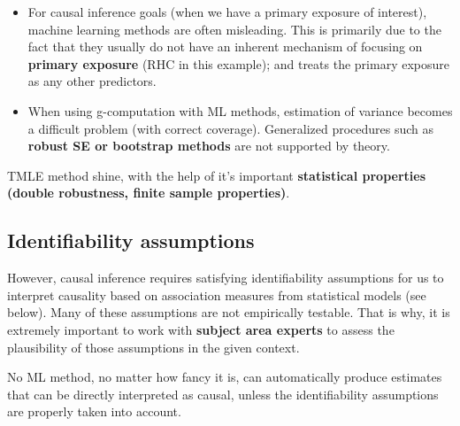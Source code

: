 \documentclass[
]{book}
\providecommand{\tightlist}{%
  \setlength{\itemsep}{0pt}\setlength{\parskip}{0pt}}
\begin{document}
\begin{itemize}
\tightlist
\item
  For causal inference goals (when we have a primary exposure of interest), machine learning methods are often misleading. This is primarily due to the fact that they usually do not have an inherent mechanism of focusing on \textbf{primary exposure} (RHC in this example); and treats the primary exposure as any other predictors.
\item
  When using g-computation with ML methods, estimation of variance becomes a difficult problem (with correct coverage). Generalized procedures such as \textbf{robust SE or bootstrap methods} are not supported by theory.
\end{itemize}

\begin{rmdcomment}
TMLE method shine, with the help of it's important \textbf{statistical
properties (double robustness, finite sample properties)}.
\end{rmdcomment}

\hypertarget{identifiability-assumptions}{%
\subsection{Identifiability assumptions}\label{identifiability-assumptions}}

However, causal inference requires satisfying identifiability assumptions for us to interpret causality based on association measures from statistical models (see below). Many of these assumptions are not empirically testable. That is why, it is extremely important to work with \textbf{subject area experts} to assess the plausibility of those assumptions in the given context.

\begin{rmdcomment}
No ML method, no matter how fancy it is, can automatically produce
estimates that can be directly interpreted as causal, unless the
identifiability assumptions are properly taken into account.
\end{rmdcomment}
\end{document}
